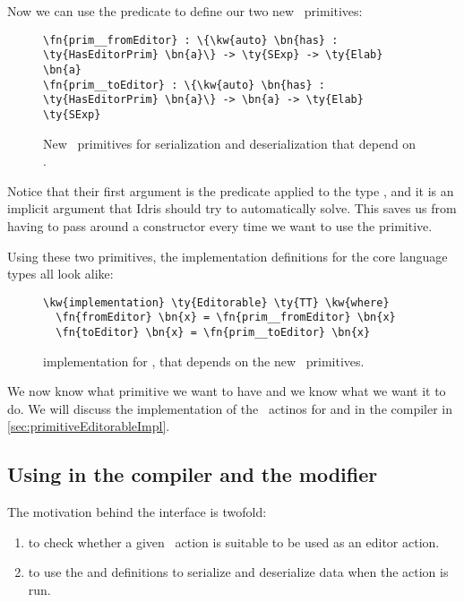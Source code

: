 Now we can use the predicate  to define our two new
\Elab\ primitives:

\begin{figure}[H]
\caption{New \Elab\ primitives for serialization and deserialization that depend on .}
\label{code:newElabPrims}
\begin{Verbatim}[framesep=2mm, label=\footnotesize{\normalfont{Idris}}, labelposition=topline]
\fn{prim__fromEditor} : \{\kw{auto} \bn{has} : \ty{HasEditorPrim} \bn{a}\} -> \ty{SExp} -> \ty{Elab} \bn{a}
\fn{prim__toEditor} : \{\kw{auto} \bn{has} : \ty{HasEditorPrim} \bn{a}\} -> \bn{a} -> \ty{Elab} \ty{SExp}
\end{Verbatim}
\end{figure}

Notice that their first argument is the predicate  applied to
the type , and it is an implicit argument that Idris should try to
automatically solve. This saves us from having to pass around a constructor
every time we want to use the primitive.

Using these two primitives, the  implementation definitions for
the core language types all look alike:

\begin{figure}[H]
\caption{ implementation for \TT, that depends on the new \Elab\ primitives.}
\begin{Verbatim}[framesep=2mm, label=\footnotesize{\normalfont{Idris}}, labelposition=topline]
\kw{implementation} \ty{Editorable} \ty{TT} \kw{where}
  \fn{fromEditor} \bn{x} = \fn{prim__fromEditor} \bn{x}
  \fn{toEditor} \bn{x} = \fn{prim__toEditor} \bn{x}
\end{Verbatim}
\end{figure}

We now know what primitive we want to have and we know what we want it to do.
We will discuss the implementation of the \Elab\ actinos for 
and  in the compiler in \autoref{sec:primitiveEditorableImpl}.

\subsection{Using  in the compiler and the  modifier}\label{ssec:usingEditorable}

The motivation behind the  interface is twofold:
\begin{enumerate}
\item to check whether a given \Elab\ action is suitable to be used as an
  editor action.
\item to use the  and  definitions to serialize
  and deserialize data when the action is run.
\end{enumerate}

